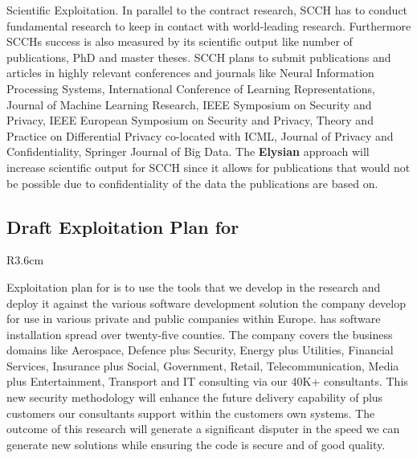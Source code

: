 \documentclass[a4paper,11pt]{article}
\newcommand{\project}[1]{\textbf{#1}\xspace}
\newcommand{\SECURITY}{\project{Elysian}}
\newcommand{\TheProject}{\SECURITY}
\begin{document}
Scientific Exploitation. In parallel to the contract research, SCCH has to conduct fundamental research to keep in
contact with world-leading research. Furthermore SCCHs success is also measured by its scientific output like number
of publications, PhD and master theses. SCCH plans to submit publications and articles in highly relevant conferences
and journals like Neural Information Processing Systems, International Conference of Learning Representations,
Journal of Machine Learning Research, IEEE Symposium on Security and Privacy, IEEE European Symposium on
Security and Privacy, Theory and Practice on Differential Privacy co-located with ICML, Journal of Privacy and
Confidentiality, Springer Journal of Big Data. The \TheProject{} approach will increase scientific output for SCCH since
it allows for publications that would not be possible due to confidentiality of the data the publications are based on.




\horizontalline

\subsection*{Draft Exploitation Plan for \SOPRAshort{}}
\vspace{-6pt}

\begin{wrapfigure}{R}{3.6cm}
\vspace{-1.3cm}
\hfill {}
\vspace{-0.8cm}
\end{wrapfigure}

Exploitation plan for \SOPRAlong{} is to use the tools that we develop in the research and deploy it against the various software development solution the company develop for use in various private and public companies within Europe. \SOPRAshort{} has software installation spread over twenty-five counties. The company covers the business domains like Aerospace, Defence plus Security, Energy plus Utilities, Financial Services, Insurance plus Social, Government, Retail, Telecommunication, Media plus Entertainment, Transport and IT consulting via our 40K+ consultants. This new security methodology will enhance the future delivery capability of \SOPRAshort{} plus customers our consultants support within the customers own systems. The outcome of this research will generate a significant disputer in the speed we can generate new solutions while ensuring the code is secure and of good quality.
\end{document}
